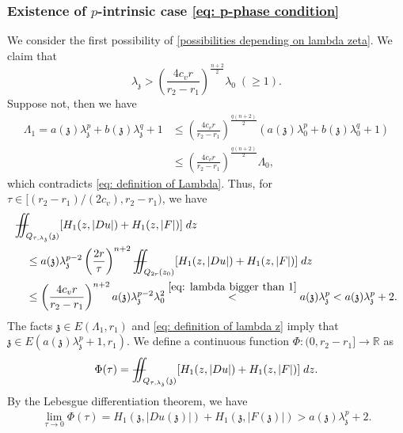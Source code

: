 \documentclass[11pt,oneside, english,reqno,twoside a4paper]{amsart}
\theoremstyle{definition}
\numberwithin{theorem}{section}
\numberwithin{equation}{section}
\newcommand{\iintss}{{\int\hspace{-0.28cm}\int}}
\newcommand{ \miints }{{\iintss\hspace{-0.56cm} -\hspace{-0.15cm}-}}
\newcommand{\miint}[1]{{\miints_{\hspace{-0.13cm}#1}}}
\begin{document}
\subsubsection{Existence of $p$-intrinsic case \eqref{eq: p-phase condition}} We consider the first possibility of \eqref{possibilities depending on lambda zeta}. We claim that 
\begin{equation}    \label{eq: lambda bigger than 1}
    \lambda_\mathfrak{z}>\left(\frac{4c_v r}{r_2-r_1}\right)^\frac{n+2}{2}\lambda_0\; (\geq 1).
\end{equation}
Suppose not, then we have
\begin{align*}    
\Lambda_1=a(\mathfrak{z})\lambda_\mathfrak{z}^p+b(\mathfrak{z})\lambda_\mathfrak{z}^q+1
&\leq \left(\frac{4c_v r}{r_2-r_1}\right)^\frac{q(n+2)}{2}(a(\mathfrak{z})\lambda_0^p+b(\mathfrak{z})\lambda_0^q+1)\\
&\leq \left(\frac{4c_v r}{r_2-r_1}\right)^\frac{q(n+2)}{2}\Lambda_0,
\end{align*}
which contradicts \eqref{eq: definition of Lambda}. Thus, for $\tau\in[(r_2-r_1)/(2c_v),r_2-r_1)$, we have 
\begin{align}\nonumber
    &\miint{Q_{\tau,\lambda_\mathfrak{z}}(\mathfrak{z})} [H_1(z,|Du|)+H_1(z,|F|)]\; dz\\ \nonumber
    &\quad \leq a(\mathfrak{z})\lambda_\mathfrak{z}^{p-2}\left(\frac{2r}{\tau}\right)^{n+2}\miint{Q_{2r}(z_0)} [H_1(z,|Du|)+H_1(z,|F|)]\; dz\\ \label{eq : basic inequality 1 in section 5}
    &\quad \leq \left(\frac{4c_v r}{r_2-r_1}\right)^{n+2} a(\mathfrak{z})\lambda_\mathfrak{z}^{p-2} \lambda_0^2 \overset{\eqref{eq: lambda bigger than 1}}{<}a(\mathfrak{z})\lambda_{\mathfrak{z}}^p <a(\mathfrak{z})\lambda_{\mathfrak{z}}^p+2.
\end{align}
The facts $\mathfrak{z}\in E(\Lambda_1,r_1)$ and \eqref{eq: definition of lambda z} imply that $\mathfrak{z}\in E(a(\mathfrak{z})\lambda_\mathfrak{z}^p+1,r_1)$. We define a continuous function $\Phi: (0, r_2-r_1]\to \mathbb{R}$ as
\begin{align*}
  \Phi (\tau)=  \miint{Q_{\tau,\lambda_\mathfrak{z}}(\mathfrak{z})} [H_1(z,|Du|)+H_1(z,|F|)]\; dz.
\end{align*}
By the Lebesgue differentiation theorem, we have 
\begin{align*}
    \lim_{\tau \to 0}\Phi(\tau)=H_1(\mathfrak z, |Du(\mathfrak z)|)+H_1(\mathfrak z, |F(\mathfrak z)|)>a(\mathfrak z)\lambda^p_{\mathfrak z}+2.
\end{align*}
\end{document}
